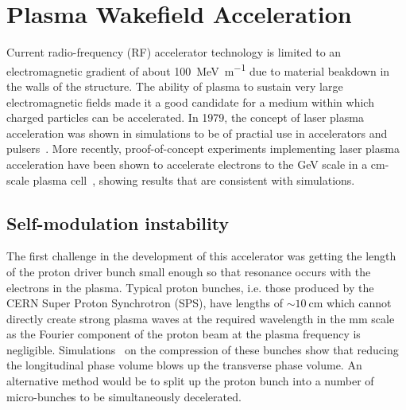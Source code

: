 \section{Plasma Wakefield Acceleration}

Current radio-frequency (RF) accelerator technology is limited to an
electromagnetic gradient of about \SI{100}{\mega\electronvolt\per\meter} due to
material beakdown in the walls of the structure.  The ability of plasma to
sustain very large electromagnetic fields made it a good candidate for a medium
within which charged particles can be accelerated. In 1979, the concept of
laser plasma acceleration was shown in simulations to be of practial use in
accelerators and pulsers~\cite{Tajima:1979bn}. More recently, proof-of-concept
experiments implementing laser plasma acceleration have been shown to
accelerate electrons to the \si{\giga\electronvolt} scale in a
\si{\centi\metre}-scale plasma cell~\cite{Lu:2006nz,Leemans:2006dx}, showing
results that are consistent with simulations.


\subsection{Self-modulation instability}

The first challenge in the development of this accelerator was getting the
length of the proton driver bunch small enough so that resonance occurs with
the electrons in the plasma.  Typical proton bunches, i.e. those produced by
the CERN Super Proton Synchrotron (SPS), have lengths of \(\sim
\SI{10}{\centi\meter}\) which cannot directly create strong plasma waves at the
required wavelength in the \si{\milli\meter} scale as the Fourier component of
the proton beam at the plasma frequency is negligible.
Simulations~\cite{kumar2010self} on the compression of these bunches show that
reducing the longitudinal phase volume blows up the transverse phase volume.
An alternative method would be to split up the proton bunch into a number of
micro-bunches to be simultaneously decelerated.

